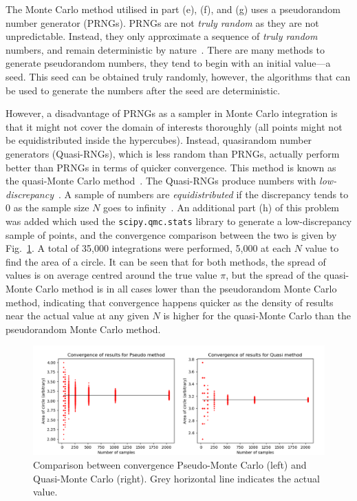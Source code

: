 \documentclass[hyphens,twocolumn,nobalancelastpage,aps,10pt,citeautoscript,longbibliography]{revtex4-2}
\begin{document}
The Monte Carlo method utilised in part (e), (f), and (g) uses a pseudorandom
number generator (PRNGs). PRNGs are not \textit{truly random} as they are not
unpredictable. Instead, they only approximate a sequence of \textit{truly
	random} numbers, and remain deterministic by nature~\cite{ka}. There are many
methods to generate pseudorandom numbers, they tend to begin with an initial
value---a seed. This seed can be obtained truly randomly, however, the
algorithms that can be used to generate the numbers after the seed are
deterministic.

However, a disadvantage of PRNGs as a sampler in Monte Carlo integration is
that it might not cover the domain of interests thoroughly (all points might
not be equidistributed inside the hypercubes). Instead, quasirandom number
generators (Quasi-RNGs), which is less random than PRNGs, actually perform
better than PRNGs in terms of quicker convergence. This method is known as the
quasi-Monte Carlo method~\cite{qmc}. The Quasi-RNGs produce numbers with
\textit{low-discrepancy}~\cite{qrngs}. A sample of numbers are
\textit{equidistributed} if the discrepancy tends to 0 as the sample size $N$
goes to infinity~\cite{es}. An additional part (h) of this problem was added
which used the \lstinline{scipy.qmc.stats} library to generate a
low-discrepancy sample of points, and the convergence comparison between the
two is given by Fig.~\ref{fig:pseudo_quasi}. A total of 35,000 integrations
were performed, 5,000 at each $N$ value to find the area of a circle. It can be
seen that for both methods, the spread of values is on average centred around
the true value $\pi$, but the spread of the quasi-Monte Carlo method is in all
cases lower than the pseudorandom Monte Carlo method, indicating that
convergence happens quicker as the density of results near the actual value at
any given $N$ is higher for the quasi-Monte Carlo than the pseudorandom Monte
Carlo method.

\begin{figure}[htpb] \centering
	\includegraphics[width=1\linewidth]{./assets/monte_carlo/pseudo_quasi.png}
	\caption{Comparison between convergence Pseudo-Monte Carlo (left) and Quasi-Monte Carlo (right). Grey horizontal line indicates the actual value.}%
	\label{fig:pseudo_quasi}
\end{figure}
\end{document}
